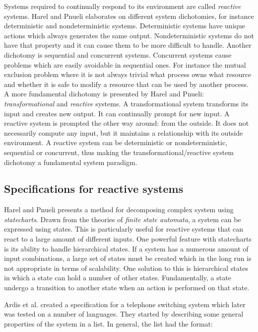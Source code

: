 Systems required to continually respond to its environment are called
\textit{reactive} systems. Harel and Pnueli \cite{harel1985development}
elaborates on different system dichotomies, for instance deterministic and
nondeterministic systems. Deterministic systems have unique actions which
always generates the same output. Nondeterministic systems do not have that
property and it can cause them to be more difficult to handle. Another
dichotomy is sequential and concurrent systems. Concurrent systems cause
problems which are easily avoidable in sequential ones. For instance the mutual
exclusion problem where it is not always trivial what process owns what
resource and whether it is safe to modify a resource that can be used by
another process. A more fundamental dichotomy is presented by Harel and Pnueli:
\textit{transformational} and \textit{reactive} systems. A transformational
system transforms its input and creates new output. It can continually prompt
for new input. A reactive system is prompted the other way around: from the
outside. It does not necessarily compute any input, but it maintains a
relationship with its outside environment. A reactive system can be
deterministic or nondeterministic, sequential or concurrent, thus making the
transformational/reactive system dichotomy a fundamental system paradigm.
\cite{harel1985development}

\subsection{Specifications for reactive systems}

Harel and Pnueli presents a method for decomposing complex system using
\textit{statecharts}. Drawn from the theories of \textit{finite state
automata}, a system can be expressed using states. This is particularly useful
for reactive systems that can react to a large amount of different inputs. One
powerful feature with statecharts is its ability to handle hierarchical states.
If a system has a numerous amount of input combinations, a large set of states
must be created which in the long run is not appropriate in terms of
scalability. One solution to this is hierarchical states in which a state can
hold a number of other states. Fundamentally, a state undergo a transition to
another state when an action is performed on that state.
\cite{harel1985development}

Ardis et al. \cite{ardis1996framework} created a specification for a telephone
switching system which later was tested on a number of languages. They started
by describing some general properties of the system in a list. In general, the
list had the format:

